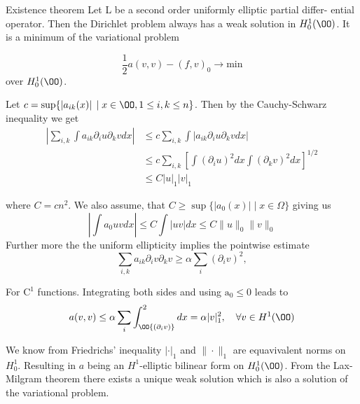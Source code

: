 \begin{thmx}{Existence theorem}
    Let L be a second order uniformly elliptic partial differ- ential operator. Then the Dirichlet problem always has a weak solution in $H_0^1(\OO)$. It is a minimum of the variational problem

    \begin{equation}
        \frac{1}{2} a(v,v) - {(f, v)}_0 \rightarrow \text{min}
    \end{equation}
    over $H_0^1(\OO)$.
\end{thmx}

\begin{bev}
    Let $c = \sup\{\left| a_{ik}(x) \right| \; | \; x \in \OO, 1 \leq i,k \leq n\}$. Then by the Cauchy-Schwarz inequality we get
    \begin{align}
        \left| \sum_{i,k} \int a_{ik} \partial_i u \partial_k v dx \right| &\leq c \sum_{i,k} \int  \left| a_{ik} \partial_i u \partial_k v dx\right|\\
        &\leq c \sum_{i,k} {\left[ \int {\left( \partial_i u \right)}^2 dx \int {\left( \partial_k v \right)}^2 dx  \right]}^{1/2} \\
        &\leq C {\left| u \right|}_1 {\left| v \right|}_1
    \end{align}

    where $C=cn^2$. 
    We also assume, that $C\geq \sup\{|a_0(x)| \; | \; x\in \Omega\}$ giving us
    \[
        \left|\int a_0 u v dx \right| \leq C \int |u v| dx \leq C \|u\|_0 \|v\|_0      
    \]
    Further more the the uniform ellipticity implies the pointwise estimate
    \[
        \sum_{i,k} a_{ik} \partial_i v \partial_k v \geq \alpha \sum_i {\left( \partial_i v \right)}^2,
    \]

    For $\text{C}^1$ functions. Integrating both sides and using $\text{a}_0 \leq 0$ leads to
    \begin{equation}
        a(v,v) \leq \alpha \sum_i \int_\OO {\left(\partial_i v\right)}^2 dx = \alpha |v|^2_1, \quad \forall v \in H^1(\OO)
    \end{equation}

    We know from Friedrichs' inequality $|\cdot|_1$ and $\| \cdot \|_1$ are equavivalent norms on $H_0^1$. Resulting in $a$ being an $H^1$-elliptic bilinear form on $H_0^1(\OO)$. From the Lax-Milgram theorem there exists a unique weak solution which is also a solution of the variational problem.
\end{bev}